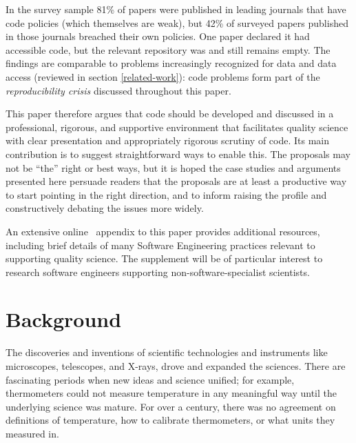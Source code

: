 \documentclass{comjnl}
\begin{document}
In the survey sample 81\% of papers were published in leading journals that have code policies (which themselves are weak), but 42\% of surveyed papers published in those journals breached their own policies. One paper declared it had accessible code, but the relevant repository was and still remains empty. The findings are comparable to problems increasingly recognized for data and data access (reviewed in section \ref{related-work}): code problems form part of the \emph{reproducibility crisis\/}  discussed throughout this paper.

This paper therefore argues that code should be developed and discussed in a professional, rigorous, and supportive environment that facilitates quality science with clear presentation and appropriately rigorous scrutiny of code. Its main contribution is to suggest straightforward ways to enable this. The proposals may not be ``the'' right or best ways, but it is hoped the case studies and arguments presented here persuade readers that the proposals are at least a productive way to start pointing in the right direction, and to inform raising the profile and constructively debating the issues more widely. 

An extensive online \supplement\ appendix to this paper provides additional resources, including brief details of many Software Engineering practices relevant to supporting quality science. The supplement will be of particular interest to research software engineers supporting non-software-specialist scientists.

\section{Background}
The discoveries and inventions of scientific technologies and instruments like microscopes, telescopes, and X-rays, drove and expanded the sciences. There are fascinating periods when new ideas and science unified; for example, thermometers could not measure temperature in any meaningful way until the underlying science was mature. For over a century, there was no agreement on definitions of temperature, how to calibrate thermometers, or what units they measured in. 
\end{document}
